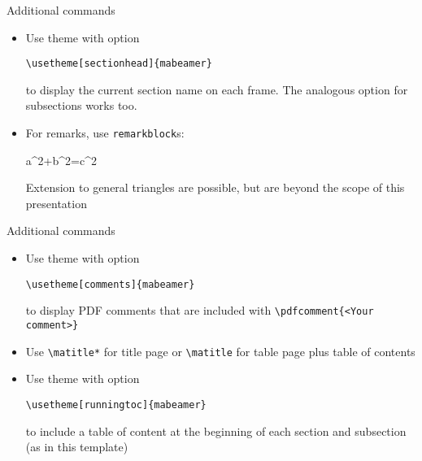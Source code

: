 \documentclass{beamer}
\begin{document}
\begin{frame}[fragile]{Additional commands}
\begin{itemize}
	\item Use theme with option
	\begin{lstlisting}
\usetheme[sectionhead]{mabeamer}
	\end{lstlisting}
	to display the current section name on each frame. The analogous option for subsections works too.

	\item For remarks, 	use \texttt{remarkblock}s:
	\begin{equationblock}[Pythagoras]
		a^2+b^2=c^2
	\end{equationblock}
	\begin{remarkblock}
		\centering Extension to general triangles are possible, but are beyond the scope of this presentation
	\end{remarkblock}
\end{itemize}
\end{frame}
\begin{frame}[fragile]{Additional commands}
\begin{itemize}
	\item Use theme with option
	\begin{lstlisting}
\usetheme[comments]{mabeamer}
	\end{lstlisting}
	to display PDF comments that are included with \verb||
	\pdfcomment{<Your comment>}
	\item Use \verb|\matitle*| for title page or \verb|\matitle| for table page plus table of contents
	\item Use theme with option
	\begin{lstlisting}
\usetheme[runningtoc]{mabeamer}
	\end{lstlisting}
	to include a table of content at the beginning of each section and subsection (as in this template)
\end{itemize}
\end{frame}
\end{document}
